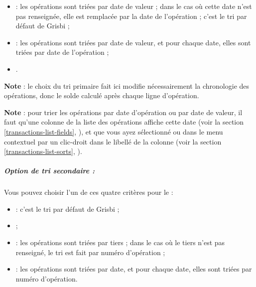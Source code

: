 \begin{itemize}
	\item {} : les opérations sont triées par date de valeur ; dans le cas où cette date n'est pas renseignée, elle est remplacée par la date de l'opération ; c'est le \gls{tri} par défaut de Grisbi ;
	\item {} : les opérations sont triées par date de valeur, et pour chaque date, elles sont triées par date de l'opération ;
	\item {}. 
\end{itemize}

\textbf{Note} : le choix du tri primaire fait ici modifie nécessairement la chronologie des opérations, donc le solde calculé après chaque ligne d'opération.

\textbf{Note} : pour trier les opérations par date d'opération ou par date de valeur, il faut qu'une colonne de la liste des opérations affiche cette date (voir la section \vref{transactions-list-fields}, ), et que vous ayez sélectionné  ou  dans le menu contextuel par un clic-droit dans le libellé de la colonne (voir la section \vref{transactions-list-sorts}, ).


\subparagraph{Option de tri secondaire :}

Vous pouvez choisir l'un de ces quatre critères pour le  :

\begin{itemize}
	\item {} : c'est le tri par défaut de Grisbi ;
	\item {} ;
	\item {} : les opérations sont triées par tiers ; dans le cas où le tiers n'est pas renseigné, le tri est fait par numéro d'opération ;
	\item {} : les opérations sont triées par date, et pour chaque date, elles sont triées par numéro d'opération.
\end{itemize}


